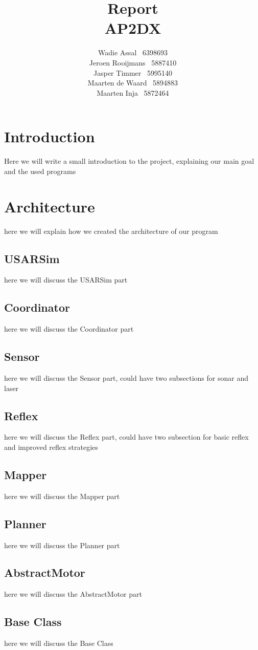 \documentclass[a4paper,10pt]{article}
\title{Report\\AP2DX}
\author{Wadie Assal \ 6398693 \\ Jeroen Rooijmans \ 5887410 \\ Jasper Timmer \ 5995140 \\
Maarten de Waard \ 5894883 \\ Maarten Inja \ 5872464}
\begin{document}
\maketitle
\newpage

\section{Introduction}
Here we will write a small introduction to the project, explaining our main goal and the used programs
\section{Architecture}
here we will explain how we created the architecture of our program
\subsection{USARSim}
here we will discuss the USARSim part
\subsection{Coordinator}
here we will discuss the Coordinator part
\subsection{Sensor}
here we will discuss the Sensor part, could have two subsections for sonar and laser
\subsection{Reflex}
here we will discuss the Reflex part, could have two subsection for basic reflex and improved reflex strategies
\subsection{Mapper}
here we will discuss the Mapper part
\subsection{Planner}
here we will discuss the Planner part
\subsection{AbstractMotor}
here we will discuss the AbstractMotor part
\subsection{Base Class}
here we will discuss the Base Class
\end{document}

